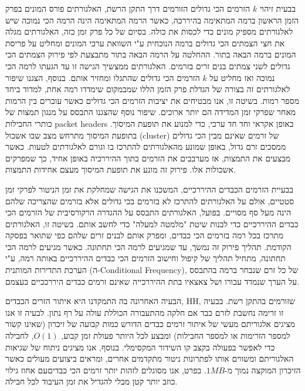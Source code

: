 {בבעית זיהוי \textenglish{$k$} הזרמים הכי גדולים הזורמים דרך התקן הרשת, האלגורתים פורס המונים בפרק הזמן הראשון ברמה המתאימה בהיררכה, כאשר הרמה המתאימה הינה הרמה הכי נמוכה שיש לאלגורתים מספיק מונים כדי לכסות את כולה. בסיום של כל פרק זמן כזה, האלגורתים מגלה את חצי הצמתים הכי גדולים ברמה הנוכחית ע"י השוואת ערכי המונים ומחליט על פריסת המונים ברמה הבאה בתור. ההחלטה על הרמה הבאה בתור מתבצעת לפי פירוק הצמתים הכי גדולים לשני צמתים בנים זרים בזרמים. האלגורתים ממצשיך הגישה זו עד הגעתו לרמה הכי נמוכה ואז מחליט על \textenglish{$k$} הזרמים הכי גדולים שהתגלו ומחזיר אותם. בנוסף, הצגנו שיפור לאלגורתים זה בצורה של הגדלת פרק הזמן הללו שמבמקום שימדדו רמה אחת, למדוד ביחד מספר רמות. בשיטה זו, אנו מבטיחים את יציבות הזרמים הכי גדולים כאשר עוברים בין הרמות מאחר שפרקי זמן המדידה הם יותר ארוכים. שיפור נוסף שהצגנו התבסס על מנגון תמצות של כותרי החבילות \textenglish{packet headers} באופן אקראי וחד חד ערכי, כדי למנוע את תופעת המיסוך. בתופעת המיסוך מתרחש מצב שבו אשכול (\textenglish{cluster}) של זרמים שאינם מבין הכי גדולים ממסכים זרם גדול, באופן שמונע מהאלגורתים להתרכז בו וגורם לאלגורתים לטעות. כאשר מבצעים את התמצות, אז מערבבים את הזרמים בתוך ההיררכיה באופן אחיד, כך שמפרקים אשכולות אלו. פירוק זה מונע את תופעת המיסוך מעצם אחידות התמצות.

בבעיית הזרמים הכבדים ההיררכיים, המשכנו את הגישה שמחלקת את זמן הניטור לפרקי זמן סטטיים, אולם על האלגורתים להתרכז לא בזרמים בכי גדולים אלא בזרמים שהצריכה שלהם הינה מעל סף מסויים. בפועל, האלגורתים התבסס על ההגדרה הרקורסיבית של הזרמים הכי כבדים ההיררכיים כדי לבנות שיטת "מלמטה למעלה" כדי לחשב אותם. בשיטה זו, האלגורתים מתרכז בכל רמה בזרמים הכי כבדים, ומפרק אותם לבנים זרים שלהם כפי שתואר בפסקה הקודמת. תהליך פירוק זה נמשך, עד שמגיעים לרמה הכי תחתונה. כאשר מגיעים לרמה הכי תחתונה, מתחיל תהליך של קיפול וחישוב הזרמים הכי כבדים ההיררכיים באותה רמה, ע"י הערכת התדירות המותנית (ה-\textenglish{Conditional Frequency}), של כל זרם שנבחר ברמה בהתבסס על הערך שנמדד עבורו ושל צאצאיו בתת ההיררכייה שאינם זרמים כבדים היררככיים בעצמם.

הבעיה האחרונה בה התמקדנו היא איתור הזרים הכבדים, \textenglish{HH}, שזורמים בהתקן רשת. בבעיה זו זרימה נחשבת לזרם כבד אם חלקה מהתעבורה הכוללת עולה על רף נתון. לבעיה זו אנו מציגים אלגוריתם מעשי של איתור זרמים כבדים הדורש כמות קבועה של זיכרון (שאינו קשור למספר הזרימות או למספר החבילות) ומבצע לכל היותר פעולת זמן קבוע, \textenglish{$O(1)$}, לחבילה כדי לאפשר בפעולה בקצב קו השידור המקסימלי. בנוסף, אנו מציגים ניתוח של שגיאות האלגוריתם ומשווים אותו לפתרונות ניטור מתקדמים אחרים, ומראים ביצועים מעולים כאשר הזיכרון המוקצה נמוך מ-\textenglish{$1MB$}. בפרט, אנו מסוגלים לזהות יותר זרמים הכי כבדיםעם אחוז גילוי כוזב יותר קטן מבלי להגדיל את זמן העיבוד לכל חבילה.

}
